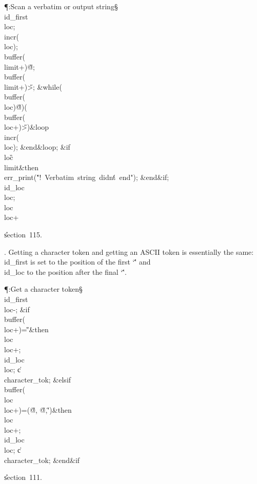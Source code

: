 \Y\P\?\4:Scan a verbatim or output string\X\S\?\6
\\{id\_first}\?\K\?\\{loc};\5
\\{incr}\?\1(\?\\{loc}\?\2)\?;\5
\\{buffer}\?\1(\?\\{limit}\?+\?\2)\K\?\H{@};\5
\\{buffer}\?\1(\?\\{limit}\?+\?\2)\K\?\H{>};\6
\1\&{while}\?\8\1(\?\\{buffer}\?\1(\?\\{loc}\?\2)\I\?\H{@}\?\2)\V\1(\?%
\\{buffer}\?\1(\?\\{loc}\?+\?\2)\I\?\H{>}\?\2)\?\8\&{loop}\6
\\{incr}\?\1(\?\\{loc}\?\2)\?;\2\6
\&{end}\8\&{loop};\6
\&{if}\1\1\8\\{loc}\?\G\?\\{limit}\2\8\&{then}\6
\\{err\_print}\?\1(\?\.{"!\ Verbatim\ string\ didn\'t\ end"}\?\2)\?;\2\6
\&{end}\8\2\&{if}\1;\6
\\{id\_loc}\?\K\?\\{loc};\5
\\{loc}\?\K\?\\{loc}\?+\par
\U section~115.\fi

. Getting a character token and getting an ASCII token is essentially
the same: \\{id\_first} is set to the position of the first `\.\'' and
\\{id\_loc} to the position after the final `\.\''.

\Y\P\?\4:Get a character token\X\S\?\6
\\{id\_first}\?\K\?\\{loc}\?-;\6
\&{if}\1\1\8\\{buffer}\?\1(\?\\{loc}\?+\?\2)=\?\H{\'}\2\8\&{then}\6
\\{loc}\?\K\?\\{loc}\?+;\5
\\{id\_loc}\?\K\?\\{loc};\5
\|c\?\K\?\\{character\_tok};\6
\4\&{elsif}\1\8\\{buffer}\?\1(\?\\{loc}\?\to\?\\{loc}\?+\?\2)=\1(\?\H{@}\?,%
\?\H{@}\?,\?\H{\'}\?\2)\?\2\8\&{then}\6
\\{loc}\?\K\?\\{loc}\?+;\5
\\{id\_loc}\?\K\?\\{loc};\5
\|c\?\K\?\\{character\_tok};\2\6
\&{end}\8\2\&{if}\1\par
\U section~111.\fi

